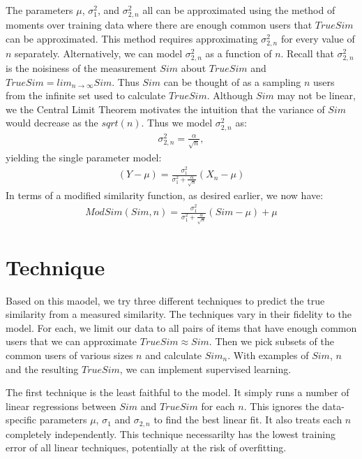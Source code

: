 \documentclass[11pt]{article}
\begin{document}
The parameters $\mu$, $\sigma_{1}^2$, and $\sigma_{2,n}^2$ all can be approximated 
using the method of moments over training data where there are enough common
users that $TrueSim$ can be approximated. This method requires approximating
$\sigma_{2,n}^2$ for every value of $n$ separately. Alternatively, we can model
$\sigma_{2,n}^2$ as a function of $n$. Recall that $\sigma_{2,n}^2$ is the
noisiness of the measurement $Sim$ about $TrueSim$ and $TrueSim = lim_{n \to
\infty}Sim$. Thus $Sim$ can be thought of as a sampling $n$ users from the
infinite set used to calculate $TrueSim$. Although $Sim$ may not be linear, we
the Central Limit Theorem motivates the intuition that the variance of $Sim$
would decrease as the $sqrt(n)$. Thus we model $\sigma_{2,n}^2$ as:
\begin{align}
\sigma_{2,n}^2 = \frac{\alpha}{\sqrt{n}},
\end{align}
yielding the single parameter model:
\begin{align}
\left(Y - \mu\right) = \frac{\sigma_{1}^2}{\sigma_{1}^2+\frac{\alpha}{\sqrt{n}}}
\left(X_n-\mu\right)
\end{align}
In terms of a modified similarity function, as desired earlier, we now have:
\begin{align}
ModSim(Sim, n) = \frac{\sigma_{1}^2}{\sigma_{1}^2+\frac{\alpha}{\sqrt{n}}}
\left(Sim-\mu\right) + \mu
\end{align}

\section*{Technique}
Based on this maodel, we try three different techniques to predict the true similarity from a
measured similarity. The techniques vary in their fidelity to the model. For
each, we limit our data to all pairs of items that have enough common users that
we can approximate $TrueSim \approx Sim$. Then we pick subsets of the common
users of various sizes $n$ and calculate $Sim_{n}$. With examples of $Sim$, $n$
and the resulting $TrueSim$, we can implement supervised learning.

The first technique is the least faithful to the model. It simply runs a number
of linear regressions between $Sim$ and $TrueSim$ for each $n$. This ignores the 
data-specific parameters $\mu$, $\sigma_{1}$ and $\sigma_{2,n}$ to find the best 
linear fit. It also treats each $n$ completely independently. This technique 
necessarilty has the lowest training error of all linear techniques, potentially 
at the risk of overfitting.
\end{document}
